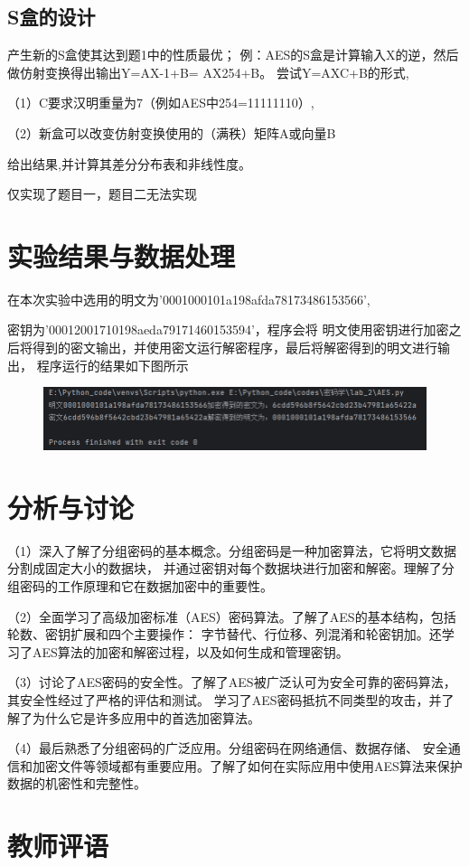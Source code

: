 \documentclass[a4paper,11pt,UTF8]{ctexart}
\newcommand{\bottomcaption}{%
\setlength{\abovecaptionskip}{6pt}%
\setlength{\belowcaptionskip}{6pt}%
\caption}
\newcommand{\xiaowuhao}{\fontsize{9pt}{\baselineskip}\selectfont}   %
\begin{document}
    \subsection{S盒的设计}
        产生新的S盒使其达到题1中的性质最优；
        例：AES的S盒是计算输入X的逆，然后做仿射变换得出输出Y=AX-1+B= AX254+B。
        尝试Y=AXC+B的形式,\par
        （1）C要求汉明重量为7（例如AES中254=11111110）,\par
        （2）新盒可以改变仿射变换使用的（满秩）矩阵A或向量B \par
        给出结果,并计算其差分分布表和非线性度。\par
        仅实现了题目一，题目二无法实现

\section{实验结果与数据处理}
    在本次实验中选用的明文为'0001000101a198afda78173486153566',\par
    密钥为'00012001710198aeda79171460153594'，程序会将
    明文使用密钥进行加密之后将得到的密文输出，并使用密文运行解密程序，最后将解密得到的明文进行输出，
    程序运行的结果如下图所示
    \begin{figure}[H]
        \centering
        \includegraphics[width=13cm]{result.png}
        \bottomcaption{\xiaowuhao{AES加密解密结果}}
    \end{figure}

\section{分析与讨论}
    （1）深入了解了分组密码的基本概念。分组密码是一种加密算法，它将明文数据分割成固定大小的数据块，
        并通过密钥对每个数据块进行加密和解密。理解了分组密码的工作原理和它在数据加密中的重要性。\par
    （2）全面学习了高级加密标准（AES）密码算法。了解了AES的基本结构，包括轮数、密钥扩展和四个主要操作：
        字节替代、行位移、列混淆和轮密钥加。还学习了AES算法的加密和解密过程，以及如何生成和管理密钥。\par
    （3）讨论了AES密码的安全性。了解了AES被广泛认可为安全可靠的密码算法，其安全性经过了严格的评估和测试。
        学习了AES密码抵抗不同类型的攻击，并了解了为什么它是许多应用中的首选加密算法。\par
    （4）最后熟悉了分组密码的广泛应用。分组密码在网络通信、数据存储、
        安全通信和加密文件等领域都有重要应用。了解了如何在实际应用中使用AES算法来保护数据的机密性和完整性。\par

\section{教师评语}
\end{document}
